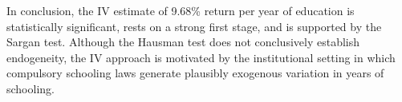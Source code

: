 \documentclass[a4paper]{article}
\begin{document}
\begin{enumerate}
\begin{enumerate}
{                        In conclusion, the IV estimate of 9.68\% return per year of education
                        is statistically significant, rests on a strong first stage, and is
                        supported by the Sargan test. Although the Hausman test does not
                        conclusively establish endogeneity, the IV approach is motivated by
                        the institutional setting in which compulsory schooling laws generate
                        plausibly exogenous variation in years of schooling.
                    }

          \end{enumerate}

\end{enumerate}
\end{document}
